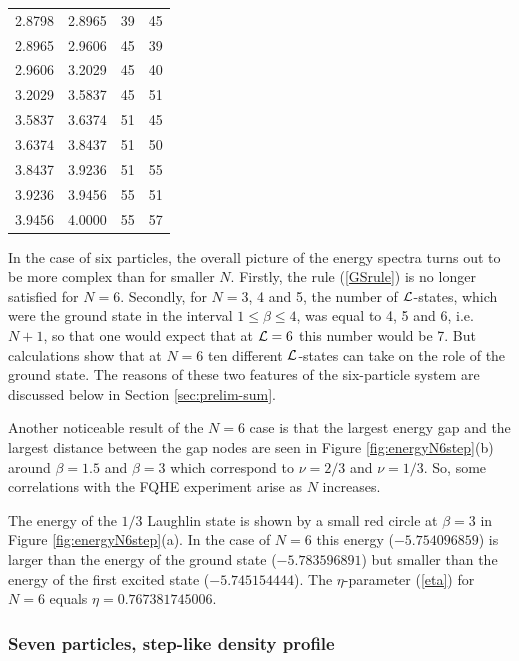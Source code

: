 \documentclass[aps,prb,10pt%
]{revtex4-2}
\begin{document}
\begin{table}[!ht]
\begin{tabular}{cccc}
2.8798	& 2.8965	& 39	& 45 \\
2.8965	& 2.9606	& 45	& 39 \\
2.9606	& 3.2029	& 45	& 40 \\
3.2029	& 3.5837	& 45	& 51 \\
3.5837	& 3.6374	& 51	& 45 \\
3.6374	& 3.8437	& 51	& 50 \\
3.8437	& 3.9236	& 51	& 55 \\
3.9236	& 3.9456	& 55	& 51 \\
3.9456	& 4.0000	& 55	& 57 \\
\end{tabular}
\end{table}

In the case of six particles, the overall picture of the energy spectra turns out to be more complex than for smaller $N$. Firstly, the rule (\ref{GSrule}) is no longer satisfied for $N=6$. Secondly, for $N=3$, 4 and 5, the number of ${\cal L}$-states, which were the ground state in the interval $1\le\beta\le 4$, was equal to 4, 5 and 6, i.e. $N+1$, so that one would expect that at ${\cal L}=6$ this number would be 7. But calculations show that at $N=6$ ten different ${\cal L}$-states can take on the role of the ground state. The reasons of these two features of the six-particle system are discussed below in Section \ref{sec:prelim-sum}.

Another noticeable result of the $N=6$ case is that the largest energy gap and the largest distance between the gap nodes are seen in Figure \ref{fig:energyN6step}(b) around $\beta=1.5$ and $\beta=3$ which correspond to $\nu=2/3$ and $\nu=1/3$. So, some correlations with the FQHE experiment arise as $N$ increases. 

The energy of the $1/3$ Laughlin state is shown by a small red circle at $\beta=3$ in Figure \ref{fig:energyN6step}(a). In the case of $N=6$ this energy ($-5.754096859$) is larger than the energy of the ground state  ($-5.783596891$) but smaller than the energy of the first excited state  ($-5.745154444$). The $\eta$-parameter (\ref{eta}) for $N=6$ equals $\eta=0.767381745006$.

\subsubsection{Seven particles, step-like density profile}
\end{document}
